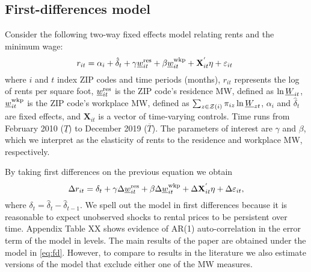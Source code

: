     
\subsection{First-differences model}

Consider the following two-way fixed effects model relating rents and the 
minimum wage:
\begin{equation*} \label{eq:did_lev}
    r_{it} = \alpha_i + \hat{\delta}_t 
           + \gamma \underline{w}^{\text{res}}_{it} + \beta \underline{w}^{\text{wkp}}_{it}
           + \mathbf{X}^{'}_{it}\eta
           + \varepsilon_{it} \ 
\end{equation*}    
where
$i$ and $t$ index ZIP codes and time periods (months),
$r_{it}$ represents the log of rents per square foot,
$\underline{w}^{\text{res}}_{it}$ is the ZIP code's residence MW, defined as 
$\ln \underline{W}_{it}$,
$\underline{w}^{\text{wkp}}_{it}$ is the ZIP code's workplace MW, defined as 
$\sum_{z\in\mathcal{Z}(i)} \pi_{iz}\ln \underline{W}_{zt}$,
$\alpha_i$ and $\hat{\delta}_t$ are fixed effects, and 
$\mathbf{X}_{it}$ is a vector of time-varying controls.
Time runs from February 2010 ($\underline{T}$) to December 2019 ($\overline{T}$).
The parameters of interest are $\gamma$ and $\beta$, which we interpret as the 
elasticity of rents to the residence and workplace MW, respectively.

By taking first differences on the previous equation we obtain
\begin{equation}\label{eq:fd}
    \Delta r_{it} = \delta_t
                  + \gamma \Delta \underline{w}^{\text{res}}_{it} + \beta \Delta \underline{w}^{\text{wkp}}_{it}
                  + \Delta \mathbf{X}^{'}_{it}\eta
                  + \Delta \varepsilon_{it} ,
\end{equation}
where $\delta_t = \hat{\delta}_t - \hat{\delta}_{t-1}$.
We spell out the model in first differences because it is reasonable to expect 
unobserved shocks to rental prices to be persistent over time. 
Appendix Table XX shows evidence of AR(1) auto-correlation in the error term of
the model in levels.
The main results of the paper are obtained under the model in \eqref{eq:fd}. 
However, to compare to results in the literature we also estimate versions of 
the model that exclude either one of the MW measures.


